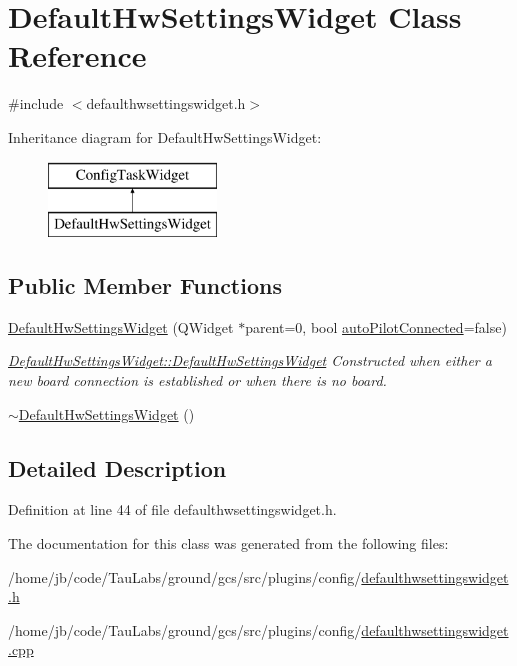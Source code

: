 \hypertarget{class_default_hw_settings_widget}{\section{\-Default\-Hw\-Settings\-Widget \-Class \-Reference}
\label{class_default_hw_settings_widget}
}


{\ttfamily \#include $<$defaulthwsettingswidget.\-h$>$}

\-Inheritance diagram for \-Default\-Hw\-Settings\-Widget\-:\begin{figure}[H]
\begin{center}
\leavevmode
\includegraphics[height=2.000000cm]{class_default_hw_settings_widget}
\end{center}
\end{figure}
\subsection*{\-Public \-Member \-Functions}
\begin{DoxyCompactItemize}
\item 
\hyperlink{group___config_plugin_ga70b182d3a503dd16f8ac5c389306bc50}{\-Default\-Hw\-Settings\-Widget} (\-Q\-Widget $\ast$parent=0, bool \hyperlink{group___u_a_v_object_widget_utils_ga6812138654a8b49e72c674cee7245781}{auto\-Pilot\-Connected}=false)
\begin{DoxyCompactList}\small\item\em \hyperlink{group___config_plugin_ga70b182d3a503dd16f8ac5c389306bc50}{\-Default\-Hw\-Settings\-Widget\-::\-Default\-Hw\-Settings\-Widget} \-Constructed when either a new board connection is established or when there is no board. \end{DoxyCompactList}\item 
\hyperlink{group___config_plugin_ga0789663f8a021f1e85e03a41f99639c9}{$\sim$\-Default\-Hw\-Settings\-Widget} ()
\end{DoxyCompactItemize}


\subsection{\-Detailed \-Description}


\-Definition at line 44 of file defaulthwsettingswidget.\-h.



\-The documentation for this class was generated from the following files\-:\begin{DoxyCompactItemize}
\item 
/home/jb/code/\-Tau\-Labs/ground/gcs/src/plugins/config/\hyperlink{defaulthwsettingswidget_8h}{defaulthwsettingswidget.\-h}\item 
/home/jb/code/\-Tau\-Labs/ground/gcs/src/plugins/config/\hyperlink{defaulthwsettingswidget_8cpp}{defaulthwsettingswidget.\-cpp}\end{DoxyCompactItemize}
